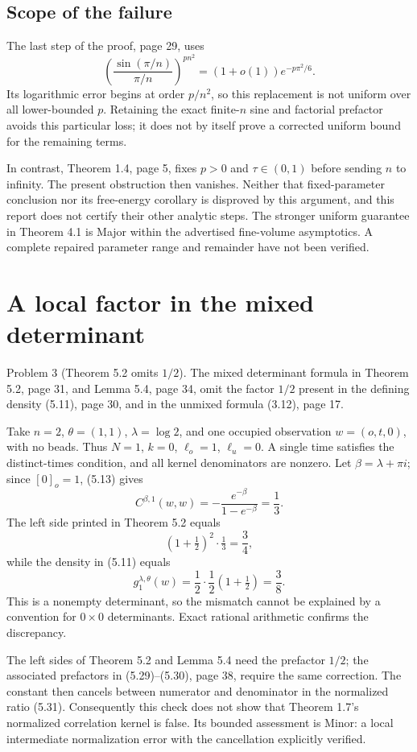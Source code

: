\documentclass[10pt]{article}
\begin{document}
\subsection*{Scope of the failure}
The last step of the proof, page 29, uses \[\left(\frac{\sin(\pi/n)}{\pi/n}\right)^{pn^2}
 =(1+o(1))e^{-p\pi^2/6}.\] Its logarithmic error begins at order \(p/n^2\), so this replacement is not uniform over all lower-bounded \(p\). Retaining the exact finite-\(n\) sine and factorial prefactor avoids this particular loss; it does not by itself prove a corrected uniform bound for the remaining terms.\par
In contrast, Theorem 1.4, page 5, fixes \(p>0\) and \(\tau\in(0,1)\) before sending \(n\) to infinity. The present obstruction then vanishes. Neither that fixed-parameter conclusion nor its free-energy corollary is disproved by this argument, and this report does not certify their other analytic steps. The stronger uniform guarantee in Theorem 4.1 is Major within the advertised fine-volume asymptotics. A complete repaired parameter range and remainder have not been verified.\par
\section*{A local factor in the mixed determinant}
Problem 3 (Theorem 5.2 omits \(1/2\)).  The mixed determinant formula in Theorem 5.2, page 31, and Lemma 5.4, page 34, omit the factor \(1/2\) present in the defining density (5.11), page 30, and in the unmixed formula (3.12), page 17.\par
Take \(n=2\), \(\theta=(1,1)\), \(\lambda=\log2\), and one occupied observation \(w=(o,t,0)\), with no beads. Thus \(N=1\), \(k=0\), \(\ell_o=1\), \(\ell_u=0\). A single time satisfies the distinct-times condition, and all kernel denominators are nonzero. Let \(\beta=\lambda+\pi i\); since \([0]_o=1\), (5.13) gives \[C^{\beta,1}(w,w)
 =-\frac{e^{-\beta}}{1-e^{-\beta}}
 =\frac13.\] The left side printed in Theorem 5.2 equals \[(1+\tfrac12)^2\cdot\tfrac13=\frac34,\] while the density in (5.11) equals \[g_1^{\lambda,\theta}(w)
 =\frac12\cdot\frac12(1+\tfrac12)=\frac38.\] This is a nonempty determinant, so the mismatch cannot be explained by a convention for \(0\times0\) determinants. Exact rational arithmetic confirms the discrepancy.\par
The left sides of Theorem 5.2 and Lemma 5.4 need the prefactor \(1/2\); the associated prefactors in (5.29)–(5.30), page 38, require the same correction. The constant then cancels between numerator and denominator in the normalized ratio (5.31). Consequently this check does not show that Theorem 1.7’s normalized correlation kernel is false. Its bounded assessment is Minor: a local intermediate normalization error with the cancellation explicitly verified.\par
\end{document}
